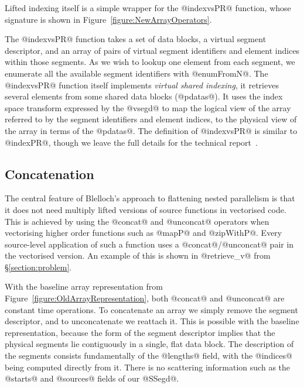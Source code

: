 Lifted indexing itself is a simple wrapper for the @indexvsPR@ function, whose signature is shown in Figure~\ref{figure:NewArrayOperators}.
\par
\begin{small}
\end{small}
%
The @indexvsPR@ function takes a set of data blocks, a virtual segment descriptor, and an array of pairs of virtual segment identifiers and element indices within those segments. As we wish to lookup one element from each segment, we enumerate all the available segment identifiers with @enumFromN@. The @indexvsPR@ function itself implements \emph{virtual shared indexing}, it retrieves several elements from some shared data blocks (@pdatas@). It uses the index space transform expressed by the @vsegd@ to map the logical view of the array referred to by the segment identifiers and element indices, to the physical view of the array in terms of the @pdatas@. The definition of @indexvsPR@ is similar to @indexPR@, though we leave the full details for the technical report~\cite{lippmeier-etal:replicate-tr}.


\subsection{Concatenation}
\label{section:ConcatUnconcat}
The central feature of Blelloch's approach to flattening nested parallelism is that it does not need multiply lifted versions of source functions in vectorised code. This is achieved by using the @concat@ and @unconcat@ operators when vectorising higher order functions such as @mapP@ and @zipWithP@. Every source-level application of such a function uses a @concat@/@unconcat@ pair in the vectorised version. An example of this is shown in @retrieve_v@ from \S\ref{section:problem}.

With the baseline array representation from Figure~\ref{figure:OldArrayRepresentation}, both @concat@ and @unconcat@ are constant time operations. To concatenate an array we simply remove the segment descriptor, and to unconcatenate we reattach it. This is possible with the baseline representation, because the form of the segment descriptor implies that the physical segments lie contiguously in a single, flat data block. The description of the segments consists fundamentally of the @lengths@ field, with the @indices@ being computed directly from it. There is no scattering information such as the @starts@ and @sources@ fields of our @SSegd@. 

